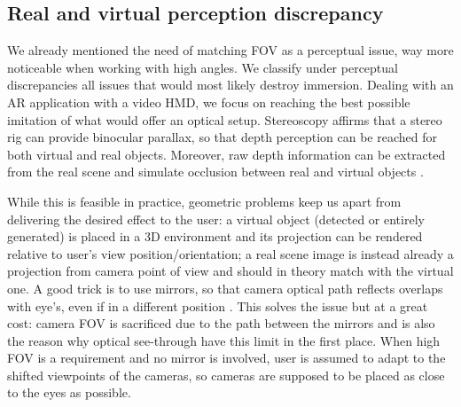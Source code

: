 \subsection{Real and virtual perception discrepancy}
We already mentioned the need of matching FOV as a perceptual issue, way more noticeable when working with high angles. We classify under perceptual discrepancies all issues that would most likely destroy immersion. Dealing with an AR application with a video HMD, we focus on reaching the best possible imitation of what would offer an optical setup. Stereoscopy affirms that a stereo rig can provide binocular parallax, so that depth perception can be reached for both virtual and real objects. Moreover, raw depth information can be extracted from the real scene and simulate occlusion between real and virtual objects \cite{GPU_accel_stereo_AR}.

While this is feasible in practice, geometric problems keep us apart from delivering the desired effect to the user: a virtual object (detected or entirely generated) is placed in a 3D environment and its projection can be rendered relative to user's view position/orientation; a real scene image is instead already a projection from camera point of view and should in theory match with the virtual one. A good trick is to use mirrors, so that camera optical path reflects overlaps with eye's, even if in a different position \cite{optical_vs_video_st}. This solves the issue but at a great cost: camera FOV is sacrificed due to the path between the mirrors and is also the reason why optical see-through have this limit in the first place. When high FOV is a requirement and no mirror is involved, user is assumed to adapt to the shifted viewpoints of the cameras, so cameras are supposed to be placed as close to the eyes as possible.

